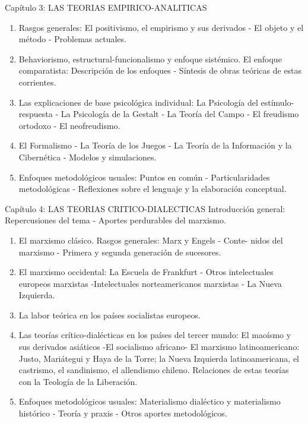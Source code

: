 \documentclass[
]{book}
\begin{document}
Capítulo 3: LAS TEORIAS EMPIRICO-ANALITICAS

\begin{enumerate}
\def\labelenumi{\alph{enumi})}
\item
  Rasgos generales: El positivismo, el empirismo y sus derivados - El objeto y el método - Problemas actuales.
\item
  Behaviorismo, estructural-funcionalismo y enfoque sistémico. El enfoque comparatista: Descripción de los enfoques - Síntesis de obras teóricas de estas corrientes.
\item
  Las explicaciones de base psicológica individual: La Psicología del estímulo-respuesta - La Psicología de la Gestalt - La Teoría del Campo - El freudismo ortodoxo - El neofreudismo.
\item
  El Formalismo - La Teoría de los Juegos - La Teoría de la Información y la Cibernética - Modelos y simulaciones.
\item
  Enfoques metodológicos usuales: Puntos en común - Particularidades metodológicas - Reflexiones sobre el lenguaje y la elaboración conceptual.
\end{enumerate}

Capítulo 4: LAS TEORIAS CRITICO-DIALECTICAS Introducción general: Repercusiones del tema - Aportes perdurables del marxismo.

\begin{enumerate}
\def\labelenumi{\alph{enumi})}
\item
  El marxismo clásico. Rasgos generales: Marx y Engels - Conte- nidos del marxismo - Primera y segunda generación de sucesores.
\item
  El marxismo occidental: La Escuela de Frankfurt - Otros intelectuales europeos marxistas -Intelectuales norteamericanos marxistas - La Nueva Izquierda.
\item
  La labor teórica en los países socialistas europeos.
\item
  Las teorías crítico-dialécticas en los países del tercer mundo: El maoísmo y sus derivados asiáticos -El socialismo africano- El marxismo latinoamericano: Justo, Mariátegui y Haya de la Torre; la Nueva Izquierda latinoamericana, el castrismo, el sandinismo, el allendismo chileno. Relaciones de estas teorías con la Teología de la Liberación.
\item
  Enfoques metodológicos usuales: Materialismo dialéctico y materialismo histórico - Teoría y praxis - Otros aportes metodológicos.
\end{enumerate}
\end{document}
